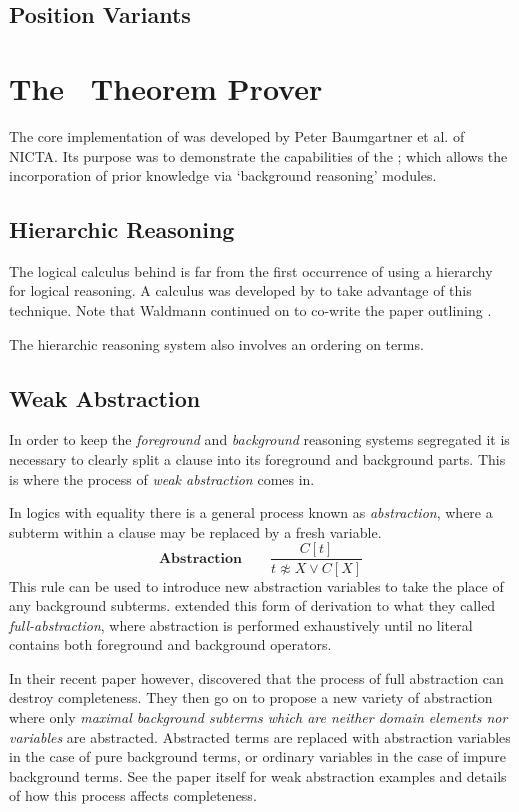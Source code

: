 \subsection{Position Variants}

\section{The \Beagle\ Theorem Prover}
\label{sec:beagle}

The core implementation of {\beagle} was developed by Peter Baumgartner et al. of NICTA.
Its purpose was to demonstrate the capabilities of the \emph{\HSWAC};
which allows the incorporation of prior knowledge via `background reasoning' modules. \cite{baum13}

\subsection{Hierarchic Reasoning}
\label{sec:hier}
The logical calculus behind {\beagle} is far from the first occurrence of using a hierarchy for
logical reasoning. A calculus was developed by  to take advantage
of this technique. Note that Waldmann continued on to co-write the paper outlining
{\HSWA} \cite{baum13}.

The hierarchic reasoning system also involves an ordering on terms.

\subsection{Weak Abstraction}
In order to keep the \emph{foreground} and \emph{background} reasoning
systems segregated it is necessary to clearly split a clause into its foreground
and background parts. This is where the process of \emph{weak abstraction} comes in.

In logics with equality there is a general process known as \emph{abstraction},
where a subterm within a clause may be replaced by a fresh variable.
\[\textbf{Abstraction}\quad\quad \frac{C[t]}{t\not\approx X \lor C[X]}\]
This rule can be used to introduce new abstraction variables to take the place
of any background subterms.  extended this form of derivation to what they called \emph{full-abstraction},
where abstraction is performed exhaustively until no literal contains both foreground
and background operators.

In their recent paper however,  discovered that the process 
of full abstraction can destroy completeness. They then go on to propose a new
variety of abstraction where only \emph{maximal background subterms which are
neither domain elements nor variables} are abstracted. Abstracted terms are replaced
with abstraction variables in the case of pure background terms, or ordinary variables
in the case of impure background terms. See the paper itself for weak abstraction
examples and details of how this process affects completeness.

